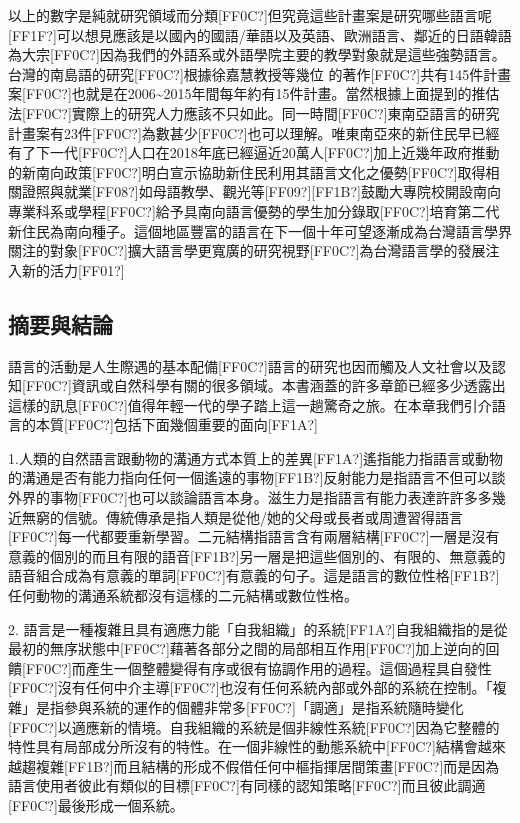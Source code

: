 以上的數字是純就研究領域而分類[FF0C?]但究竟這些計畫案是研究哪些語言呢[FF1F?]可以想見應該是以國內的國語/華語以及英語、歐洲語言、鄰近的日語韓語為大宗[FF0C?]因為我們的外語系或外語學院主要的教學對象就是這些強勢語言。台灣的南島語的研究[FF0C?]根據徐嘉慧教授等幾位  的著作[FF0C?]共有145件計畫案[FF0C?]也就是在2006{\textasciitilde}2015年間每年約有15件計畫。當然根據上面提到的推估法[FF0C?]實際上的研究人力應該不只如此。同一時間[FF0C?]東南亞語言的研究計畫案有23件[FF0C?]為數甚少[FF0C?]也可以理解。唯東南亞來的新住民早已經有了下一代[FF0C?]人口在2018年底已經逼近20萬人[FF0C?]加上近幾年政府推動的新南向政策[FF0C?]明白宣示協助新住民利用其語言文化之優勢[FF0C?]取得相關證照與就業[FF08?]如母語教學、觀光等[FF09?][FF1B?]鼓勵大專院校開設南向專業科系或學程[FF0C?]給予具南向語言優勢的學生加分錄取[FF0C?]培育第二代新住民為南向種子。這個地區豐富的語言在下一個十年可望逐漸成為台灣語言學界關注的對象[FF0C?]擴大語言學更寬廣的研究視野[FF0C?]為台灣語言學的發展注入新的活力[FF01?]

\subsection{摘要與結論} %

語言的活動是人生際遇的基本配備[FF0C?]語言的研究也因而觸及人文社會以及認知[FF0C?]資訊或自然科學有關的很多領域。本書涵蓋的許多章節已經多少透露出這樣的訊息[FF0C?]值得年輕一代的學子踏上這一趟驚奇之旅。在本章我們引介語言的本質[FF0C?]包括下面幾個重要的面向[FF1A?]

1.人類的自然語言跟動物的溝通方式本質上的差異[FF1A?]遙指能力指語言或動物的溝通是否有能力指向任何一個遙遠的事物[FF1B?]反射能力是指語言不但可以談外界的事物[FF0C?]也可以談論語言本身。滋生力是指語言有能力表達許許多多幾近無窮的信號。傳統傳承是指人類是從他/她的父母或長者或周遭習得語言[FF0C?]每一代都要重新學習。二元結構指語言含有兩層結構[FF0C?]一層是沒有意義的個別的而且有限的語音[FF1B?]另一層是把這些個別的、有限的、無意義的語音組合成為有意義的單詞[FF0C?]有意義的句子。這是語言的數位性格[FF1B?]任何動物的溝通系統都沒有這樣的二元結構或數位性格。

2. 語言是一種複雜且具有適應力能「自我組織」的系統[FF1A?]自我組織指的是從最初的無序狀態中[FF0C?]藉著各部分之間的局部相互作用[FF0C?]加上逆向的回饋[FF0C?]而產生一個整體變得有序或很有協調作用的過程。這個過程具自發性[FF0C?]沒有任何中介主導[FF0C?]也沒有任何系統內部或外部的系統在控制。「複雜」是指參與系統的運作的個體非常多[FF0C?]「調適」是指系統隨時變化[FF0C?]以適應新的情境。自我組織的系統是個非線性系統[FF0C?]因為它整體的特性具有局部成分所沒有的特性。在一個非線性的動態系統中[FF0C?]結構會越來越趨複雜[FF1B?]而且結構的形成不假借任何中樞指揮居間策畫[FF0C?]而是因為語言使用者彼此有類似的目標[FF0C?]有同樣的認知策略[FF0C?]而且彼此調適[FF0C?]最後形成一個系統。

